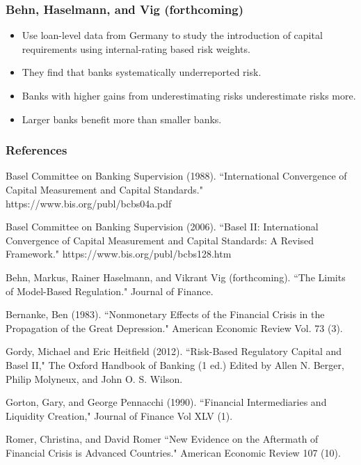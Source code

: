 \documentclass{beamer}
\begin{document}
\begin{frame}[label = bhv]
\frametitle{Behn, Haselmann, and Vig (forthcoming)}


\begin{itemize}

\item Use loan-level data from Germany to study the introduction of capital requirements using internal-rating based risk weights.

\bigskip

\item They find that banks systematically underreported risk.

\bigskip

\item Banks with higher gains from underestimating risks underestimate risks more.

\bigskip

\item Larger banks benefit more than smaller banks.

\end{itemize}

\hyperlink{risk_weights}{}

\end{frame}


\begin{frame}
\frametitle{References}
\scriptsize

Basel Committee on Banking Supervision (1988). ``International Convergence of Capital Measurement and Capital Standards." https://www.bis.org/publ/bcbs04a.pdf

\bigskip


Basel Committee on Banking Supervision (2006). ``Basel II: International Convergence of Capital Measurement and Capital Standards: A Revised Framework." https://www.bis.org/publ/bcbs128.htm

\bigskip

Behn, Markus, Rainer Haselmann, and Vikrant Vig (forthcoming). ``The Limits of Model-Based Regulation." Journal of Finance.

\bigskip

Bernanke, Ben (1983). ``Nonmonetary Effects of the Financial Crisis in the Propagation of the Great Depression." American Economic Review Vol. 73 (3).

\bigskip

Gordy, Michael and Eric Heitfield (2012). ``Risk-Based Regulatory Capital and Basel II," The Oxford Handbook of Banking (1 ed.) Edited by Allen N. Berger, Philip Molyneux, and John O. S. Wilson.

\bigskip

Gorton, Gary, and George Pennacchi (1990). ``Financial Intermediaries and Liquidity Creation," Journal of Finance Vol XLV (1).

\bigskip

Romer, Christina, and David Romer ``New Evidence on the Aftermath of Financial Crisis is Advanced Countries." American Economic Review 107 (10).

\bigskip

\end{frame}
\end{document}

